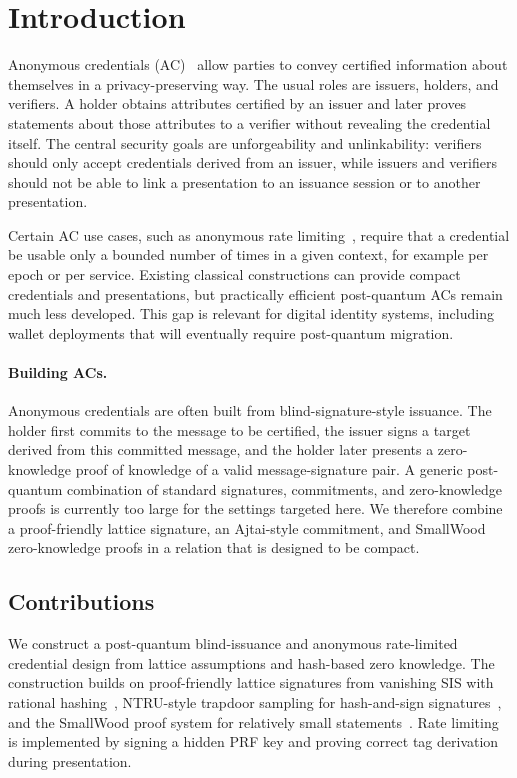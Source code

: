 \section{Introduction}
\label{sec:intro}

Anonymous credentials (AC)~\cite{chaum85-anonymous-credentials,EC:Brands95,EC:CamLys01} allow parties to
convey certified information about themselves in a privacy-preserving way.  The usual roles are issuers,
holders, and verifiers.  A holder obtains attributes certified by an issuer and later proves statements about
those attributes to a verifier without revealing the credential itself.  The central security goals are
unforgeability and unlinkability: verifiers should only accept credentials derived from an issuer, while issuers
and verifiers should not be able to link a presentation to an issuance session or to another presentation.

Certain AC use cases, such as anonymous rate limiting~\cite{ietf-privacypass-arc-protocol-01,schlesinger-cfrg-act-00},
require that a credential be usable only a bounded number of times in a given context, for example per
epoch or per service.  Existing classical constructions can provide compact credentials and presentations, but
practically efficient post-quantum ACs remain much less developed.  This gap is relevant for digital identity
systems, including wallet deployments that will eventually require post-quantum migration.

\paragraph*{Building ACs.}
Anonymous credentials are often built from blind-signature-style issuance.  The holder first commits to the
message to be certified, the issuer signs a target derived from this committed message, and the holder later
presents a zero-knowledge proof of knowledge of a valid message-signature pair.  A generic post-quantum
combination of standard signatures, commitments, and zero-knowledge proofs is currently too large for the
settings targeted here.  We therefore combine a proof-friendly lattice signature, an Ajtai-style commitment, and
SmallWood zero-knowledge proofs in a relation that is designed to be compact.

\subsection{Contributions}
We construct a post-quantum blind-issuance and anonymous rate-limited credential design from lattice
assumptions and hash-based zero knowledge.  The construction builds on proof-friendly lattice signatures
from vanishing SIS with rational hashing~\cite{EPRINT:DKLW25,PKC:DKLW25}, NTRU-style trapdoor sampling
for hash-and-sign signatures~\cite{EPRINT:ENSTW23}, and the SmallWood proof system for relatively small
statements~\cite{EPRINT:FenRiv25b}.  Rate limiting is implemented by signing a hidden PRF key and proving
correct tag derivation during presentation.

